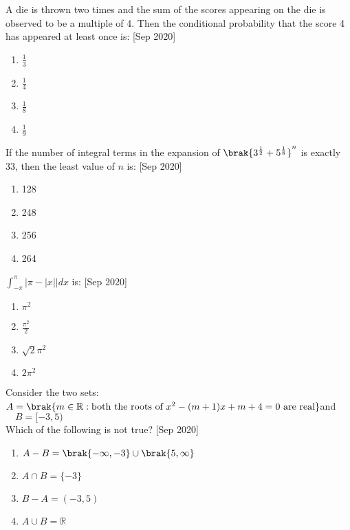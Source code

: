     \item A die is thrown two times and the sum of the scores appearing on the die is observed to be a multiple of 4. Then the conditional probability that the score 4 has appeared at least once is:
    \hfill{[Sep 2020]}
    \begin{enumerate}
        \item $ \frac{1}{3} $
        \item $ \frac{1}{4} $
        \item $ \frac{1}{8} $
        \item $ \frac{1}{9} $
    \end{enumerate}

    \item If the number of integral terms in the expansion of $ \brak{3^{\frac{1}{2}} + 5^{\frac{1}{8}}}^{n} $ 
    is exactly 33, then the least value of $ n $ is:
    \hfill{[Sep 2020]}
    \begin{enumerate}
        \item 128
        \item 248
        \item 256
        \item 264
    \end{enumerate}

    \item $ \int_{-\pi}^{\pi} |\pi-|x|| dx $ is:
    \hfill{[Sep 2020]}
    \begin{enumerate}
        \item $ \pi^2 $
        \item $ \frac{\pi^2}{2} $
        \item $ \sqrt{2} \pi^2$
        \item $ 2\pi^2 $
    \end{enumerate}

    \item Consider the two sets:\\
    $ A = \brak{ m \in \mathbb{R} : \text{both the roots of } x^2 - (m+1)x + m + 4 = 0 \text{ are real} }$and$\quad B = [-3, 5) $\\
    Which of the following is not true?
    \hfill{[Sep 2020]}
    \begin{enumerate}
        \item $ A - B = \brak{-\infty, -3} \cup \brak{5, \infty} $
        \item $ A \cap B = \{-3\} $
        \item $ B - A = (-3, 5) $
        \item $ A \cup B = \mathbb{R} $
    \end{enumerate}

